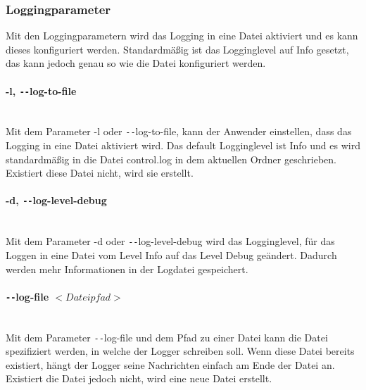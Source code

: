 \subsubsection{Loggingparameter}
Mit den Loggingparametern wird das Logging in eine Datei aktiviert und es kann dieses konfiguriert werden. Standardmäßig ist das Logginglevel auf Info gesetzt, das kann jedoch genau so wie die Datei konfiguriert werden.

\paragraph{-l, \texttt{-{}-}log-to-file}\mbox{} \\
Mit dem Parameter -l oder \texttt{-{}-}log-to-file, kann der Anwender einstellen, dass das Logging in eine Datei aktiviert wird. Das default Logginglevel ist Info und es wird standardmäßig in die Datei control.log in dem aktuellen Ordner geschrieben. Existiert diese Datei nicht, wird sie erstellt.

\paragraph{-d, \texttt{-{}-}log-level-debug}\mbox{} \\
Mit dem Parameter -d oder \texttt{-{}-}log-level-debug wird das Logginglevel, für das Loggen in eine Datei vom Level Info auf das Level Debug geändert. Dadurch werden mehr Informationen in der Logdatei gespeichert.

\paragraph{\texttt{-{}-}log-file $<Dateipfad>$}\mbox{} \\
Mit dem Parameter \texttt{-{}-}log-file und dem Pfad zu einer Datei kann die Datei spezifiziert werden, in welche der Logger schreiben soll. Wenn diese Datei bereits existiert, hängt der Logger seine Nachrichten einfach am Ende der Datei an. Existiert die Datei jedoch nicht, wird eine neue Datei erstellt.
